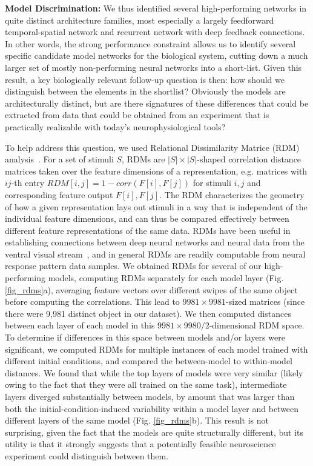 \textbf{Model Discrimination:}  We thus identified several high-performing networks in quite distinct architecture families, most especially a largely feedforward temporal-spatial network and recurrent network with deep feedback connections. 
In other words, the strong performance constraint allows us to identify several specific candidate model networks for the biological system, cutting down a much larger set of mostly non-performing neural networks into a short-list. 
Given this result, a key biologically relevant follow-up question is then: how should we distinguish between the elements in the shortlist?   
Obviously the models are architecturally distinct, but are there signatures of these differences that could be extracted from data that could be obtained from an experiment that is practically realizable with today's neurophysiological tools? 

To help address this question, we used Relational Dissimilarity Matrice (RDM) analysis~\cite{}. 
For a set of stimuli $S$, RDMs are $|S| \times |S|$-shaped correlation distance matrices taken over the feature dimensions of a representation, e.g. matrices with $ij$-th entry $RDM[i, j] = 1 - corr(F[i], F[j])$ for stimuli $i, j$ and corresponding feature output $F[i], F[j]$.  
The RDM characterizes the geometry of how a given representation lays out stimuli in a way that is independent of the individual feature dimensions, and can thus be compared effectively between different feature representations of the same data.
RDMs have been useful in establishing connections between deep neural networks and neural data from the ventral visual stream~\cite{}, and in general RDMs are readily computable from neural response pattern data samples. 
We obtained RDMs for several of our high-performing models, computing RDMs separately for each model layer (Fig. \ref{fig_rdms}a), averaging feature vectors over different swipes of the same object before computing the correlations.
This lead to $9981\times9981$-sized matrices (since there were 9,981 distinct object in our dataset).
We then computed distances between each layer of each model in this $9981\times9980/2$-dimensional RDM space. 
To determine if differences in this space between models and/or layers were significant, we computed RDMs for multiple instances of each model trained with different initial conditions, and compared the between-model to within-model distances.  
We found that while the top layers of models were very similar (likely owing to the fact that they were all trained on the same task), intermediate layers diverged substantially between models, by amount that was larger than both the initial-condition-induced variability within a model layer and between different layers of the same model (Fig. \ref{fig_rdms}b).
This result is not surprising, given the fact that the models are quite structurally different, but its utility is that it strongly suggests that a potentially feasible neuroscience experiment could distinguish between them. 



